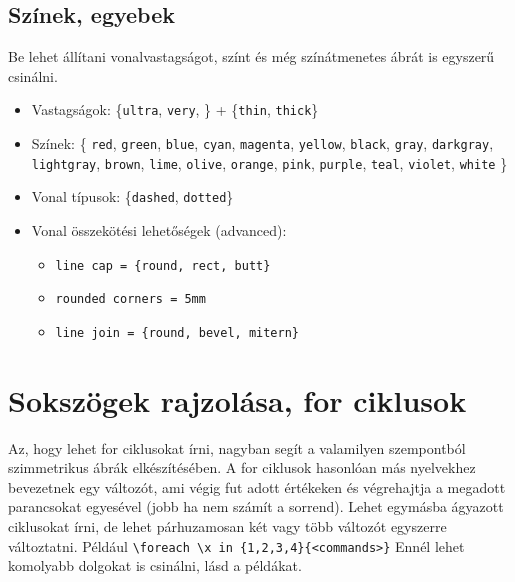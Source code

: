 \subsection{Színek, egyebek}

Be lehet állítani vonalvastagságot, színt és még színátmenetes ábrát is egyszerű csinálni.
\begin{itemize}
    \item Vastagságok: \{\verb|ultra|, \verb|very|, \} + \{\verb|thin|, \verb|thick|\}
    \item Színek: \{ \verb|red|, \verb|green|, \verb|blue|, \verb|cyan|, \verb|magenta|, \verb|yellow|, \verb|black|, \verb|gray|, \verb|darkgray|, \verb|lightgray|, \verb|brown|, \verb|lime|, \verb|olive|, \verb|orange|, \verb|pink|, \verb|purple|, \verb|teal|, \verb|violet|, \verb|white| \}
    \item Vonal típusok: \{\verb|dashed|, \verb|dotted|\}
    \item Vonal összekötési lehetőségek (advanced): \begin{itemize}
        \item \verb|line cap = {round, rect, butt}|
        \item \verb|rounded corners = 5mm|
        \item \verb|line join = {round, bevel, mitern}|
        \end{itemize}
\end{itemize}

\begin{tikzExample}
\end{tikzExample}

\section{Sokszögek rajzolása, for ciklusok}

Az, hogy lehet for ciklusokat írni, nagyban segít a valamilyen szempontból szimmetrikus ábrák elkészítésében. A for ciklusok hasonlóan más nyelvekhez bevezetnek egy változót, ami végig fut adott értékeken és végrehajtja a megadott parancsokat egyesével (jobb ha nem számít a sorrend).  Lehet egymásba ágyazott ciklusokat írni, de lehet párhuzamosan két vagy több változót egyszerre változtatni. Például \verb|\foreach \x in {1,2,3,4}{<commands>}| Ennél lehet komolyabb dolgokat is csinálni, lásd a példákat.

